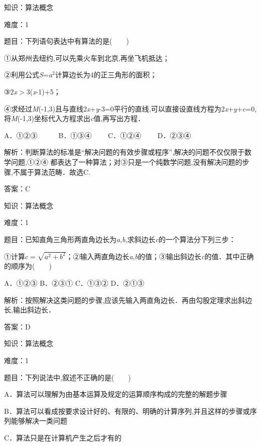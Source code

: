 \documentclass{article} %
\begin{document}







知识：算法概念

难度：1

题目：下列语句表达中有算法的是(　　)

①从郑州去纽约,可以先乘火车到北京,再坐飞机抵达；

②利用公式\textit{S}=\textit{a}${}^{2}$计算边长为4的正三角形的面积；

③2\textit{x}$\mathrm{>}$3(\textit{x}-1)+5；

④求经过\textit{M}(-1,3)且与直线2\textit{x}+\textit{y}-3=0平行的直线,可以直接设直线方程为2\textit{x}+\textit{y}+\textit{c}=0,将\textit{M}(-1,3)坐标代入方程求出\textit{c}值,再写出方程．

A．①②③　　　B．①③④　　
C．①②④　　 D．②③④　　

解析：判断算法的标准是``解决问题的有效步骤或程序'',解决的问题不仅仅限于数学问题,①②④ 都表达了一种算法；对③只是一个纯数学问题,没有解决问题的步骤,不属于算法范畴．故选C.

答案：C

知识：算法概念

难度：1

题目：已知直角三角形两直角边长为\textit{a},\textit{b},求斜边长\textit{c}的一个算法分下列三步：

①计算$c=\sqrt{a^2+b^2}$；②输入两直角边长\textit{a},\textit{b}的值；③输出斜边长\textit{c}的值．其中正确的顺序为(　　)

A．①②③    B．②③①    
C．①③②    D．②①③ 

解析：按照解决这类问题的步骤,应该先输入两直角边长．再由勾股定理求出斜边长,输出斜边长．

答案：D

知识：算法概念

难度：1

题目：下列说法中,叙述不正确的是(　　)

A．算法可以理解为由基本运算及规定的运算顺序构成的完整的解题步骤

B．算法可以看成按要求设计好的、有限的、明确的计算序列,并且这样的步骤或序列能够解决一类问题

C．算法只是在计算机产生之后才有的
\end{document}

